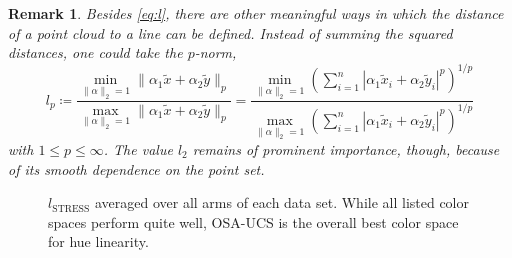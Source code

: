 \documentclass{scrartcl}
\newtheorem*{remark}{Remark}
\theoremstyle{named}
\begin{document}
\begin{remark}
Besides \eqref{eq:l}, there are other meaningful ways in which the distance of a point
cloud to a line can be defined. Instead of summing the squared distances, one could take
the $p$-norm,
\[
l_p
  \coloneqq
  \frac{
    \min_{\|\alpha\|_2=1} \|\alpha_1 \tilde{x} + \alpha_2\tilde{y}\|_p
  }{
    \max_{\|\alpha\|_2=1} \|\alpha_1 \tilde{x} + \alpha_2\tilde{y}\|_p
  }
  = \frac{
    \min_{\|\alpha\|_2=1}
  \left(\sum_{i=1}^n |\alpha_1 \tilde{x}_i + \alpha_2 \tilde{y}_i|^p\right)^{1/p}
}{
    \max_{\|\alpha\|_2=1}
  \left(\sum_{i=1}^n |\alpha_1 \tilde{x}_i + \alpha_2 \tilde{y}_i|^p\right)^{1/p}
}
\]
  with $1\le p \le \infty$.
  The value $l_2$ remains of prominent importance, though, because of its smooth
  dependence on the point set.
\end{remark}


\begin{figure}
  \centering
  
  \caption{$l_\text{STRESS}$ averaged over all arms of each data set.  While all listed
  color spaces perform quite well, OSA-UCS is the overall best color space for hue
  linearity.}
\end{figure}


{}

\end{document}
